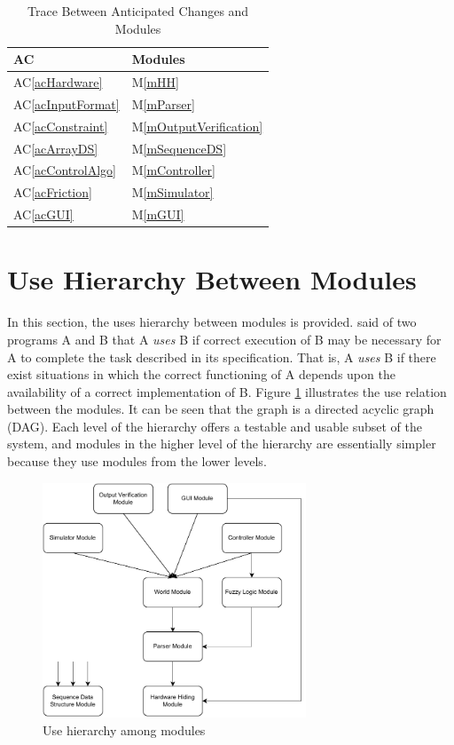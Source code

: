 \documentclass[12pt, titlepage]{article}
\newcommand{\acref}[1]{AC\ref{#1}}
\newcommand{\mref}[1]{M\ref{#1}}
\begin{document}
\begin{table}[H]
\centering
\begin{tabular}{p{} p{}}
\toprule
\textbf{AC} & \textbf{Modules}\\
\midrule
\acref{acHardware} & \mref{mHH}\\
\acref{acInputFormat} & \mref{mParser}\\
\acref{acConstraint} & \mref{mOutputVerification}\\
\acref{acArrayDS} & \mref{mSequenceDS}\\
\acref{acControlAlgo} & \mref{mController}\\
\acref{acFriction} & \mref{mSimulator}\\
\acref{acGUI} & \mref{mGUI}\\
\bottomrule
\end{tabular}
\caption{Trace Between Anticipated Changes and Modules}
\label{TblACT}
\end{table}

\section{Use Hierarchy Between Modules} \label{SecUse}

In this section, the uses hierarchy between modules is
provided. \citet{Parnas1978} said of two programs A and B that A {\em uses} B if
correct execution of B may be necessary for A to complete the task described in
its specification. That is, A {\em uses} B if there exist situations in which
the correct functioning of A depends upon the availability of a correct
implementation of B.  Figure \ref{FigUH} illustrates the use relation between
the modules. It can be seen that the graph is a directed acyclic graph
(DAG). Each level of the hierarchy offers a testable and usable subset of the
system, and modules in the higher level of the hierarchy are essentially simpler
because they use modules from the lower levels.

\begin{figure}[H]
\centering
\includegraphics[width=0.7\textwidth]{Use hierarchy 2.pdf}
\caption{Use hierarchy among modules}
\label{FigUH}
\end{figure}
\end{document}
